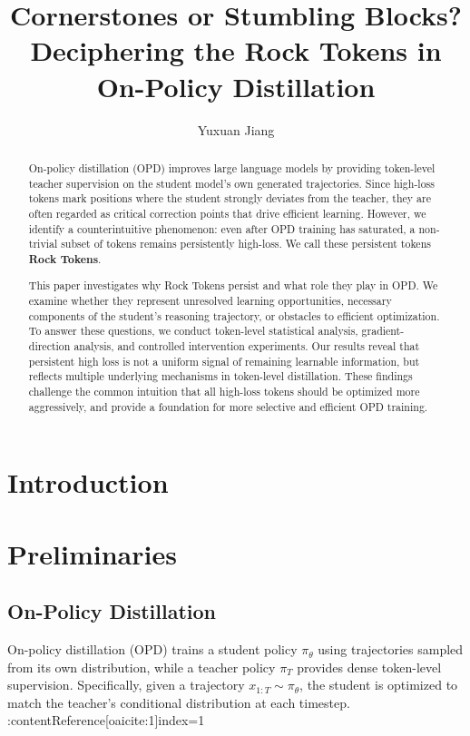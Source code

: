 \documentclass{article}
\title{Cornerstones or Stumbling Blocks? Deciphering the Rock Tokens in On-Policy Distillation}
\author{Yuxuan Jiang}
\begin{document}
\maketitle


\begin{abstract}
On-policy distillation (OPD) improves large language models by providing token-level teacher supervision on the student model's own generated trajectories. Since high-loss tokens mark positions where the student strongly deviates from the teacher, they are often regarded as critical correction points that drive efficient learning. However, we identify a counterintuitive phenomenon: even after OPD training has saturated, a non-trivial subset of tokens remains persistently high-loss. We call these persistent tokens \textbf{Rock Tokens}.

This paper investigates why Rock Tokens persist and what role they play in OPD. We examine whether they represent unresolved learning opportunities, necessary components of the student's reasoning trajectory, or obstacles to efficient optimization. To answer these questions, we conduct token-level statistical analysis, gradient-direction analysis, and controlled intervention experiments. Our results reveal that persistent high loss is not a uniform signal of remaining learnable information, but reflects multiple underlying mechanisms in token-level distillation. These findings challenge the common intuition that all high-loss tokens should be optimized more aggressively, and provide a foundation for more selective and efficient OPD training.
\end{abstract}



\section{Introduction}





\section{Preliminaries}

\subsection{On-Policy Distillation}
\label{Preliminaries:On-Policy Distillation}
On-policy distillation (OPD) trains a student policy $\pi_\theta$ using trajectories sampled from its own distribution, while a teacher policy $\pi_T$ provides dense token-level supervision. Specifically, given a trajectory $x_{1:T} \sim \pi_\theta$, the student is optimized to match the teacher's conditional distribution at each timestep. :contentReference[oaicite:1]{index=1}
\end{document}
